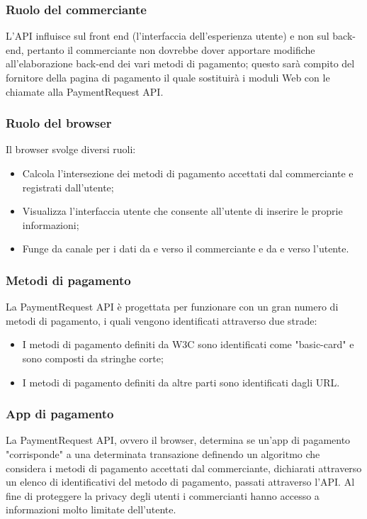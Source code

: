 \documentclass[11pt ,a4paper , twoside , openright ]{article}
\begin{document}
	\subsubsection{Ruolo del commerciante}
	L'API influisce sul front end (l'interfaccia dell'esperienza utente) e non sul back-end, pertanto il commerciante non dovrebbe dover apportare modifiche all'elaborazione back-end dei vari metodi di pagamento; questo sarà compito del fornitore della pagina di pagamento il quale sostituirà i moduli Web con le chiamate alla PaymentRequest API.
	
	\subsubsection{Ruolo del browser}
	Il browser svolge diversi ruoli:
	\begin{itemize}
	\item Calcola l'intersezione dei metodi di pagamento accettati dal commerciante e registrati dall'utente;
	\item Visualizza l'interfaccia utente che consente all'utente di inserire le proprie informazioni;
	\item Funge da canale per i dati da e verso il commerciante e da e verso l'utente.
	\end{itemize}
	
	\subsubsection{Metodi di pagamento}
	La PaymentRequest API è progettata per funzionare con un gran numero di metodi di pagamento, i quali vengono identificati attraverso due strade:
	\begin{itemize}
		\item I metodi di pagamento definiti da W3C sono identificati come "basic-card" e sono composti da stringhe corte;
		\item I metodi di pagamento definiti da altre parti sono identificati dagli URL.
	\end{itemize}
	
	\subsubsection{App di pagamento}
	La PaymentRequest API, ovvero il browser, determina se un'app di pagamento "corrisponde" a una determinata transazione definendo un algoritmo che considera i metodi di pagamento accettati dal commerciante, dichiarati attraverso un elenco di identificativi del metodo di pagamento, passati attraverso l'API.
	Al fine di proteggere la privacy degli utenti i commercianti hanno accesso a informazioni molto limitate dell'utente. 
	
\end{document}
